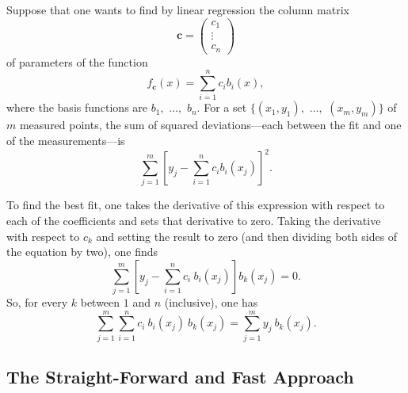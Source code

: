 \documentclass[twocolumn]{article}
\begin{document}
Suppose that one wants to find by linear regression the column matrix
\begin{equation}
   \mathbf{c} =
   \begin{pmatrix}
      c_1\\
      \vdots\\
      c_n
   \end{pmatrix}
\end{equation}
of parameters of the function
\begin{equation}
   f_{\mathbf{c}}(x) = \sum_{i=1}^{n} c_i b_i(x),
\end{equation}
where the basis functions are $b_1,$ $\ldots,$ $b_n$. For a set $\{(x_1,y_1),$
$\ldots,$ $(x_m,y_m)\}$ of $m$ measured points, the sum of squared
deviations---each between the fit and one of the measurements---is
\begin{equation}
   \sum_{j=1}^{m} \left[ y_j - \sum_{i=1}^{n} c_i b_i(x_j) \right]^2.
\end{equation}

To find the best fit, one takes the derivative of this expression with respect
to each of the coefficients and sets that derivative to zero. Taking the
derivative with respect to $c_k$ and setting the result to zero (and then
dividing both sides of the equation by two), one finds
\begin{equation}
   \sum_{j=1}^{m} \left[ y_j - \sum_{i=1}^{n} c_i \: b_i(x_j) \right] b_k(x_j)
   = 0.
\end{equation}
So, for every $k$ between $1$ and $n$ (inclusive), one has
\begin{equation}
   \sum_{j=1}^{m} \sum_{i=1}^{n} c_i \: b_i(x_j) \: b_k(x_j) = \sum_{j=1}^{m}
   y_j \: b_k(x_j).
   \label{eq:deriv-result}
\end{equation}

\subsection{The Straight-Forward and Fast Approach}
\end{document}
